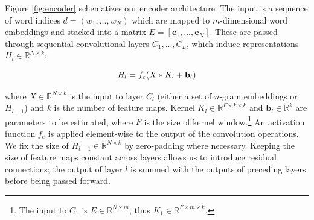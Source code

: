\documentclass[11pt,a4paper]{article}
\begin{document}
Figure \ref{fig:encoder} schematizes our encoder architecture. The input is a sequence of word indices $d = (w_{1}, ..., w_{N})$ which are mapped to $m$-dimensional word embeddings and stacked into a matrix $E = [{\mathbf e}_1, ..., {\mathbf e}_N]$. These are passed through sequential convolutional layers $C_1, ..., C_L$, which induce representations $H_l \in \mathbb{R}^{N \times k}$:

\vspace{-.5em}
\begin{equation}
\vspace{-.2em}
H_l = f_e(X * K_l + {\mathbf b_l})
\end{equation}

\noindent where $X \in \mathbb{R}^{N \times k}$ is the input to layer $C_l$ (either a set of $n$-gram embeddings or $H_{l-1}$) and $k$ is the number of feature maps. Kernel $K_l \in \mathbb{R}^{F \times k \times k}$ and ${\mathbf b_l} \in \mathbb{R}^{k}$ are parameters to be estimated, where $F$ is the size of kernel window.\footnote{The input to $C_1$ is $E \in \mathbb{R}^{N \times m}$, thus $K_1 \in \mathbb{R}^{F \times m \times k}$.} An activation function $f_e$ is applied element-wise to the output of the convolution operations. We fix the size of $H_{l-1} \in \mathbb{R}^{N \times k}$ by zero-padding where necessary. Keeping the size of feature maps constant across layers allows us to introduce residual connections; the output of layer $l$ is summed with the outputs of preceding layers before being passed forward. 
\end{document}
